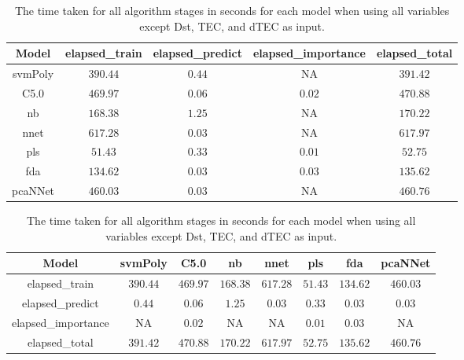 \begin{table}[!ht]
	\centering
	\begin{tabular}{|c|c|c|c|c|}
		\hline
		Model & elapsed_train & elapsed_predict & elapsed_importance & elapsed_total \\ \hline
		svmPoly & $390.44$ & $0.44$ & NA & $391.42$ \\ \hline
		C5.0 & $469.97$ & $0.06$ & $0.02$ & $470.88$ \\ \hline
		nb & $168.38$ & $1.25$ & NA & $170.22$ \\ \hline
		nnet & $617.28$ & $0.03$ & NA & $617.97$ \\ \hline
		pls & $51.43$ & $0.33$ & $0.01$ & $52.75$ \\ \hline
		fda & $134.62$ & $0.03$ & $0.03$ & $135.62$ \\ \hline
		pcaNNet & $460.03$ & $0.03$ & NA & $460.76$ \\ \hline
	\end{tabular}
	\caption{The time taken for all algorithm stages in seconds for each model when using all variables except Dst, TEC, and dTEC as input.}
	\label{tab:time:noTEC}
\end{table}

\begin{table}[!ht]
	\centering
	\begin{tabular}{|c|c|c|c|c|c|c|c|}
		\hline
		Model & svmPoly & C5.0 & nb & nnet & pls & fda & pcaNNet \\ \hline
		elapsed_train & $390.44$ & $469.97$ & $168.38$ & $617.28$ & $51.43$ & $134.62$ & $460.03$ \\ \hline
		elapsed_predict & $0.44$ & $0.06$ & $1.25$ & $0.03$ & $0.33$ & $0.03$ & $0.03$ \\ \hline
		elapsed_importance & NA & $0.02$ & NA & NA & $0.01$ & $0.03$ & NA \\ \hline
		elapsed_total & $391.42$ & $470.88$ & $170.22$ & $617.97$ & $52.75$ & $135.62$ & $460.76$ \\ \hline
	\end{tabular}
	\caption{The time taken for all algorithm stages in seconds for each model when using all variables except Dst, TEC, and dTEC as input.}
	\label{tab:time:reverse:noTEC}
\end{table}

